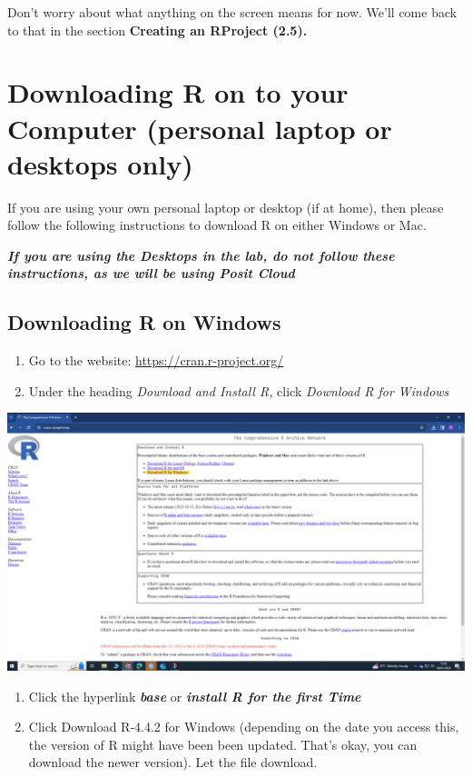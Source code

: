 \documentclass[
]{book}
\providecommand{\tightlist}{%
  \setlength{\itemsep}{0pt}\setlength{\parskip}{0pt}}
\begin{document}
Don't worry about what anything on the screen means for now. We'll come back to that in the section \textbf{Creating an RProject (2.5).}

\section{Downloading R on to your Computer (personal laptop or desktops only)}\label{downloading-r-on-to-your-computer-personal-laptop-or-desktops-only}

If you are using your own personal laptop or desktop (if at home), then please follow the following instructions to download R on either Windows or Mac.

\textbf{\emph{If you are using the Desktops in the lab, do not follow these instructions, as we will be using Posit Cloud}}

\subsection{Downloading R on Windows}\label{downloading-r-on-windows}

\begin{enumerate}
\def\labelenumi{\arabic{enumi}.}
\tightlist
\item
  Go to the website: \url{https://cran.r-project.org/}
\item
  Under the heading \emph{Download and Install R,} click \emph{Download R for Windows}
\end{enumerate}

\includegraphics{img/01-cran.png}

\begin{enumerate}
\def\labelenumi{\arabic{enumi}.}
\setcounter{enumi}{2}
\item
  Click the hyperlink \textbf{\emph{base}} or \textbf{\emph{install R for the first Time}}
\item
  Click Download R-4.4.2 for Windows (depending on the date you access this, the version of R might have been been updated. That's okay, you can download the newer version). Let the file download.
\end{enumerate}
\end{document}
